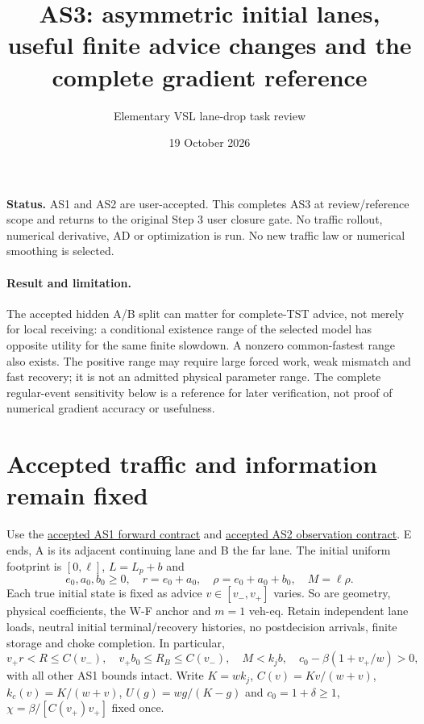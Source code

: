 \documentclass[11pt,a4paper]{article}
\title{AS3: asymmetric initial lanes, useful finite advice changes\newline
and the complete gradient reference}
\author{Elementary VSL lane-drop task review}
\date{19 October 2026}
\newcommand{\kc}{k_c}
\begin{document}
\maketitle
\noindent\textbf{Status.} AS1 and AS2 are user-accepted. This completes AS3
at review/reference scope and returns to the original Step 3 user closure
gate. No traffic rollout, numerical derivative, AD or optimization is run.
No new traffic law or numerical smoothing is selected.

\paragraph{Result and limitation.}
The accepted hidden A/B split can matter for complete-TST advice, not merely
for local receiving: a conditional existence range of the selected model
has opposite utility for the same finite slowdown. A nonzero common-fastest
range also exists. The positive range may require large forced work, weak
mismatch and fast recovery; it is not an admitted physical parameter range.
The complete regular-event sensitivity below is a reference for later
verification, not proof of numerical gradient accuracy or usefulness.

\section{Accepted traffic and information remain fixed}
Use the
\href{vsl_as1_asymmetric_forward_contract.pdf}{accepted AS1 forward contract}
and \href{vsl_as2_information_and_history.pdf}{accepted AS2 observation contract}.
E ends, A is its adjacent continuing lane and B the far lane. The initial
uniform footprint is $[0,\ell]$, $L=L_p+b$ and
\begin{equation}
 e_0,a_0,b_0\geq0,\quad r=e_0+a_0,\quad
 \rho=e_0+a_0+b_0,\quad M=\ell\rho.
 \label{eq:initial}
\end{equation}
Each true initial state is fixed as advice $v\in[v_-,v_+]$ varies.
So are geometry, physical coefficients, the W-F anchor and $m=1$ veh-eq.
Retain independent lane loads, neutral initial terminal/recovery histories,
no postdecision arrivals, finite storage and choke completion. In particular,
\begin{equation}
 v_+r<R\leq C(v_-),\quad v_+b_0\leq R_B\leq C(v_-),\quad
 M<k_jb,\quad c_0-\beta(1+v_+/w)>0,
 \label{eq:domain}
\end{equation}
with all other AS1 bounds intact. Write $K=wk_j$,
$C(v)=Kv/(w+v)$, $\kc(v)=K/(w+v)$, $U(g)=wg/(K-g)$ and
$c_0=1+\delta\geq1$, $\chi=\beta/[C(v_+)v_+]$ fixed once.
\end{document}
